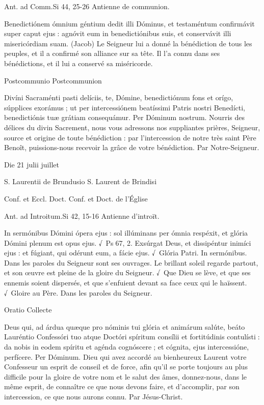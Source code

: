 \begin{paracol}{2}
Ant. ad Comm.\hfill Si 44, 25-26
\switchcolumn
Antienne de communion.
\switchcolumn*

Benedictiónem ómnium géntium dedit illi Dóminus, et testaméntum confirmávit super caput ejus : agnóvit eum in benedictiónibus suis, et conservávit illi misericórdiam suam.
\switchcolumn
(Jacob) Le Seigneur lui a donné la bénédiction de tous les peuples, et il a confirmé son alliance sur sa tête. Il l’a connu dans ses bénédictions, et il lui a conservé sa miséricorde.
\switchcolumn*

Postcommunio
\switchcolumn
Postcommunion
\switchcolumn*

Divíni Sacraménti pasti delíciis,  te, Dómine, benedictiónum fons et orígo, súpplices exorámus ; ut per intercessiónem beatíssimi Patris nostri Benedícti, benedictiónis tuæ grátiam consequámur. Per Dóminum nostrum.
\switchcolumn
Nourris des délices du divin Sacrement,  nous vous adressons nos suppliantes prières, Seigneur, source et origine de toute bénédiction : par l’intercession de notre très saint Père Benoît, puissions-nous recevoir la grâce de votre bénédiction. Par Notre-Seigneur.
\switchcolumn*

Die 21 julii
 juillet
\switchcolumn*

S. Laurentii de Brundusio
\switchcolumn
S. Laurent de Brindisi
\switchcolumn*

Conf. et Eccl. Doct.
\switchcolumn
Conf. et Doct. de l’Église
\switchcolumn*

Ant. ad Introitum.\hfill Si 42, 15-16
\switchcolumn
Antienne d’introït.
\switchcolumn*

In sermónibus Dómini ópera ejus :  sol illúminans per ómnia respéxit, et glória Dómini plenum est opus ejus. √~Ps 67, 2. Exsúrgat Deus, et dissipéntur inimíci ejus : et fúgiant, qui odérunt eum, a fácie ejus. √~Glória Patri. In sermónibus.
\switchcolumn
Dans les paroles du Seigneur sont ses ouvrages. Le brillant soleil regarde partout, et son œuvre est pleine de la gloire du Seigneur. √~Que Dieu se lève, et que ses ennemis soient dispersés, et que s’enfuient devant sa face ceux qui le haïssent. √~Gloire au Père. Dans les paroles du Seigneur.
\switchcolumn*

Oratio
\switchcolumn
Collecte
\switchcolumn*

Deus qui, ad árdua quæque pro  nóminis tui glória et animárum salúte, beáto Lauréntio Confessóri tuo atque Doctóri spíritum consílii et fortitúdinis contulísti : da nobis in eodem spíritu et agénda cognóscere ; et cógnita, ejus intercessióne, perfícere. Per Dóminum.
\switchcolumn
Dieu qui avez accordé au bienheureux  Laurent votre Confesseur un esprit de conseil et de force, afin qu’il se porte toujours au plus difficile pour la gloire de votre nom et le salut des âmes, donnez-nous, dans le même esprit, de connaître ce que nous devons faire, et d’accomplir, par son intercession, ce que nous aurons connu. Par Jésus-Christ.
\switchcolumn*


\end{paracol}
